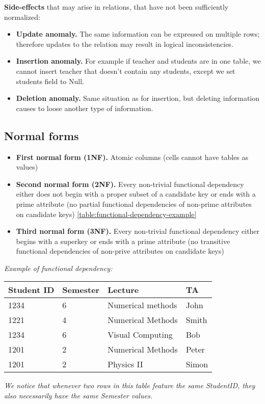 {\bf Side-effects} that may arise in relations, that have not been sufficiently
normalized:
\begin{itemize}
    \item {\bf Update anomaly.} The same information can be expressed on multiple
        rows; therefore updates to the relation may result in logical
        inconsistencies.
    \item {\bf Insertion anomaly.} For example if teacher and students are in
        one table, we cannot insert teacher that doesn't contain any students,
        except we set students field to Null.
    \item {\bf Deletion anomaly.} Same situation as for insertion, but deleting
        information causes to loose another type of information.
\end{itemize}

\subsection{Normal forms}
\begin{itemize}
    \item {\bf First normal form (1NF).} Atomic columns (cells cannot have
        tables as values)
    \item {\bf Second normal form (2NF).} Every non-trivial functional
        dependency either does not begin with a proper subset of a candidate key
        or ends with a prime attribute (no partial functional dependencies of
        non-prime attributes on candidate keys)
        \ref{table:functional-dependency-example}
    \item {\bf Third normal form (3NF).} Every non-trivial functional dependency
        either begins with a superkey or ends with a prime attribute (no
        transitive functional dependencies of non-prive attributes on candidate
        keys)
\end{itemize}

{\it Example of functional dependency:}\cite{functional-dependency}
\begin{center}
    \begin{tabular}{|l|l|l|l|} \hline
    {\bf Student ID} & {\bf Semester} & {\bf Lecture} & {\bf TA} \\\hline
    1234 & 6 & Numerical methods & John \\\hline
    1221 & 4 & Numerical Methods & Smith \\\hline
    1234 & 6 & Visual Computing & Bob \\\hline
    1201 & 2 & Numerical Methods & Peter \\\hline
    1201 & 2 & Physics II & Simon \\\hline
    \end{tabular}
    \label{table:functional-dependency-example}
\end{center}
{\it We notice that whenever two rows in this table feature the
same StudentID, they also necessarily have the same Semester values.}
    



